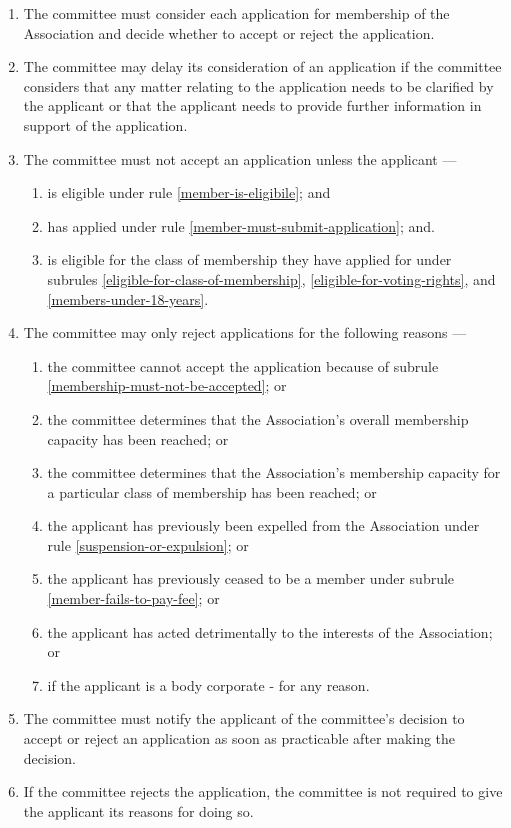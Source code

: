 \documentclass[../constitution.tex]{subfiles}
\begin{document}
\begin{enumerate}
\item The committee must consider each application for membership of the Association and decide whether to accept or reject the application.
\item The committee may delay its consideration of an application if the committee considers that any matter relating to the application needs to be clarified by the applicant or that the applicant needs to provide further information in support of the application.
\item The committee must not accept an application unless the applicant --- \label{membership-must-not-be-accepted}
  \begin{enumerate}
  \item is eligible under rule \ref{member-is-eligibile}; and
  \item has applied under rule \ref{member-must-submit-application}; and.
  \item is eligible for the class of membership they have applied for under subrules \ref{eligible-for-class-of-membership}, \ref{eligible-for-voting-rights}, and \ref{members-under-18-years}.
  \end{enumerate}

\item \label{reasons-why-committee-can-reject-membership-application} The committee may only reject applications for the following reasons ---
  \begin{enumerate}
  \item the committee cannot accept the application because of subrule \ref{membership-must-not-be-accepted}; or
  \item the committee determines that the Association's overall membership capacity has been reached; or
  \item the committee determines that the Association's membership capacity for a particular class of membership has been reached; or
  \item the applicant has previously been expelled from the Association under rule \ref{suspension-or-expulsion}; or
  \item the applicant has previously ceased to be a member under subrule \ref{member-fails-to-pay-fee}; or
  \item \label{reject-membership-detrimental} the applicant has acted detrimentally to the interests of the Association; or
  \item \label{reject-membership-body-corporate} if the applicant is a body corporate - for any reason.
  \end{enumerate}

\item The committee must notify the applicant of the committee's decision to accept or reject an application as soon as practicable after making the decision.

\item If the committee rejects the application, the committee is not required to give the applicant its reasons for doing so.
\end{enumerate}
\end{document}
